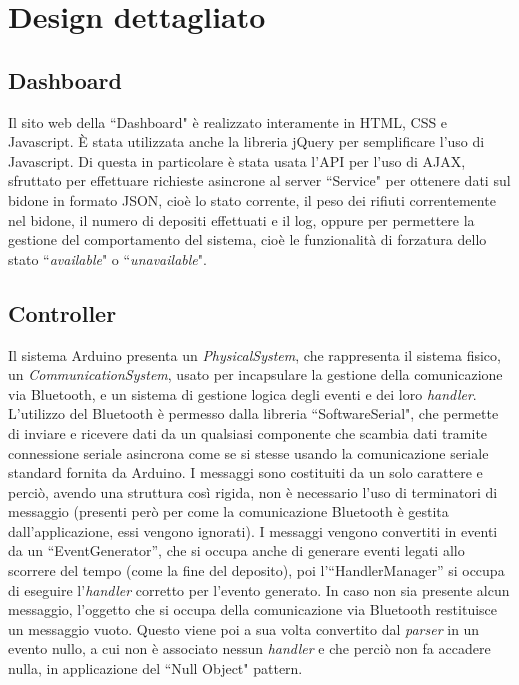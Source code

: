 \documentclass[a4paper, 12pt]{report}
\begin{document}
		\section{Design dettagliato}
			\subsection{Dashboard}
			Il sito web della ``Dashboard" è realizzato interamente in HTML, CSS e Javascript. È stata
			utilizzata anche la libreria jQuery per semplificare l'uso di Javascript. Di questa in
			particolare è stata usata l'API per l'uso di AJAX, sfruttato per effettuare richieste
			asincrone al server ``Service" per ottenere dati sul bidone in formato JSON, cioè lo stato corrente,
			il peso dei rifiuti correntemente nel bidone, il numero di depositi effettuati e il log,
			oppure per permettere la gestione del comportamento del sistema, cioè le
			funzionalità di forzatura dello stato ``\textit{available}" o ``\textit{unavailable}".
			\subsection{Controller}
			Il sistema Arduino presenta un \textit{PhysicalSystem}, che rappresenta il sistema fisico, 
			un \textit{CommunicationSystem}, usato per incapsulare la gestione della comunicazione via Bluetooth, 
			e un sistema di gestione logica degli eventi e dei loro \textit{handler}.\newline
			L'utilizzo del Bluetooth è permesso dalla libreria ``SoftwareSerial", che permette di inviare
			e ricevere dati da un qualsiasi componente che scambia dati tramite connessione seriale
			asincrona come se si stesse usando la comunicazione seriale standard fornita da Arduino.\newline 
			I messaggi sono costituiti da un solo carattere e perciò, avendo una struttura così
			rigida, non è necessario l'uso di terminatori di messaggio (presenti però per come la comunicazione
			Bluetooth è gestita dall'applicazione, essi vengono ignorati). I messaggi vengono convertiti in 
			eventi da un ``EventGenerator'', che si occupa anche di generare eventi legati allo scorrere 
			del tempo (come la fine del deposito), poi l'``HandlerManager'' si occupa di eseguire l'\textit{handler}
			corretto per l'evento generato.\newline
			In caso non sia presente alcun messaggio, l'oggetto che si occupa della comunicazione via
			Bluetooth restituisce un messaggio vuoto. Questo viene poi a sua volta convertito dal
			\textit{parser} in un evento nullo, a cui non è associato nessun \textit{handler} e che
			perciò non fa accadere nulla, in applicazione del ``Null Object" pattern.
\end{document}

